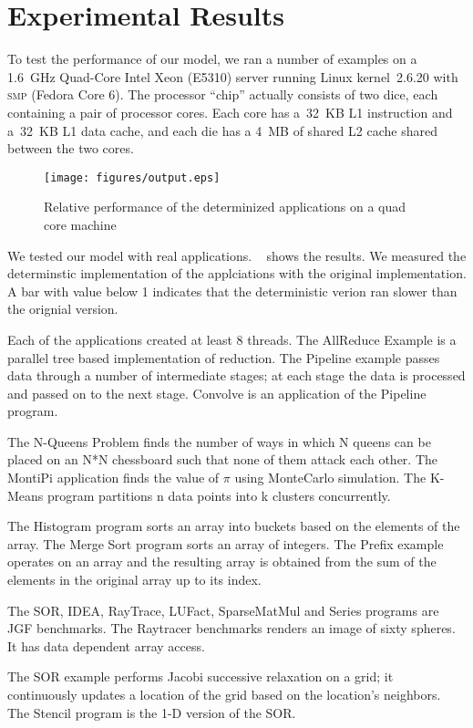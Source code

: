 \documentclass[10pt, conference, compsocconf]{IEEEtran}
\begin{document}
\section{Experimental Results}
\label{sec:experimental}

To test the performance of our model, we ran a number of examples on a 1.6~GHz
Quad-Core Intel Xeon (E5310) server running Linux kernel~2.6.20 with
\textsc{smp} (Fedora Core 6).  The processor ``chip'' actually
consists of two dice, each containing a pair of processor cores.  Each
core has a~32~KB L1 instruction and a~32~KB L1 data cache, and each
die has a 4~MB of shared L2 cache shared between the two cores.

\begin{figure*}[htbp]
\texttt{[image: figures/output.eps]}
\caption{Relative performance of the determinized applications on a quad core machine}
\label{fig:output}
\end{figure*}

We tested our model with real applications.
~
shows the results. We measured the determinstic implementation of the applciations
with the original implementation. A bar with value below 1 indicates that the deterministic
verion ran slower than the orignial version. 

Each of the applications created
at least 8 threads.
The AllReduce Example is a parallel tree based implementation of reduction.
The Pipeline example passes data through a number of intermediate stages; at each
stage the data is processed and passed on to the next stage. Convolve is an
application of the Pipeline program.

The N-Queens Problem finds the number of ways in which N queens can be placed
on an N*N chessboard such that none of them attack each other. The MontiPi application
finds the value of $\pi$ using MonteCarlo simulation. The K-Means program partitions
n data points into k clusters concurrently.

The Histogram program sorts an array into buckets based on the elements of the array.
The Merge Sort program sorts an array of integers.
The Prefix example operates on an array and the resulting array is obtained from the sum
of the elements in the original array up to its index.

The SOR, IDEA, RayTrace, LUFact, SparseMatMul and Series programs are JGF benchmarks.
The Raytracer benchmarks renders an image of sixty spheres. It has data dependent
array access.

The SOR example performs Jacobi successive relaxation
on a grid; it continuously updates a location of the grid based on the location's
neighbors.
The Stencil program is the  1-D version of the SOR.
\end{document}
